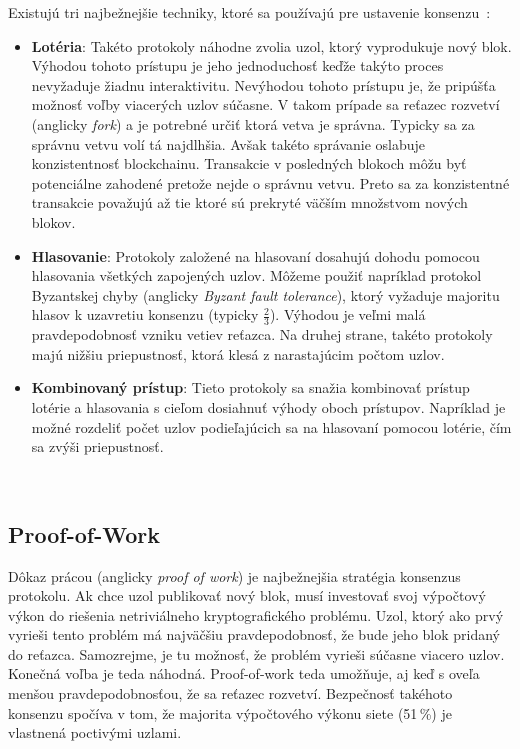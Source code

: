 Existujú tri najbežnejšie techniky, ktoré sa používajú pre ustavenie konsenzu~\cite{homoliakBlockchain}:
\begin{itemize}
	\item \textbf{Lotéria}: Takéto protokoly náhodne zvolia uzol, ktorý vyprodukuje nový blok. Výhodou tohoto prístupu je jeho jednoduchosť keďže takýto proces nevyžaduje žiadnu interaktivitu. Nevýhodou tohoto prístupu je, že pripúšťa možnosť voľby viacerých uzlov súčasne. V takom prípade sa reťazec rozvetví (anglicky \textit{fork}) a je potrebné určiť ktorá vetva je správna. Typicky sa za správnu vetvu volí tá najdlhšia. Avšak takéto správanie oslabuje konzistentnosť blockchainu. Transakcie v posledných blokoch môžu byť potenciálne zahodené pretože nejde o správnu vetvu. Preto sa za konzistentné transakcie považujú až tie ktoré sú prekryté väčším množstvom nových blokov.
	\item \textbf{Hlasovanie}: Protokoly založené na hlasovaní dosahujú dohodu pomocou hlasovania všetkých zapojených uzlov. Môžeme použiť napríklad protokol Byzantskej chyby (anglicky \textit{Byzant fault tolerance}), ktorý vyžaduje majoritu hlasov k uzavretiu konsenzu (typicky $\frac{2}{3}$). Výhodou je veľmi malá pravdepodobnosť vzniku vetiev reťazca. Na druhej strane, takéto protokoly majú nižšiu priepustnosť, ktorá klesá z narastajúcim počtom uzlov.
	\item \textbf{Kombinovaný prístup}: Tieto protokoly sa snažia kombinovať prístup lotérie a hlasovania s cieľom dosiahnuť výhody oboch prístupov. Napríklad je možné rozdeliť počet uzlov podieľajúcich sa na hlasovaní pomocou lotérie, čím sa zvýši priepustnosť.
\end{itemize}
~\cite{zhangConsensus, homoliakBlockchain}

\subsection{Proof-of-Work}\label{subsec:pow}
Dôkaz prácou (anglicky \textit{proof of work}) je najbežnejšia stratégia konsenzus protokolu. Ak chce uzol publikovať nový blok, musí investovať svoj výpočtový výkon do riešenia netriviálneho kryptografického problému. Uzol, ktorý ako prvý vyrieši tento problém má najväčšiu pravdepodobnosť, že bude jeho blok pridaný do reťazca. Samozrejme, je tu možnosť, že problém vyrieši súčasne viacero uzlov. Konečná voľba je teda náhodná. Proof-of-work teda umožňuje, aj keď s oveľa menšou pravdepodobnosťou, že sa reťazec rozvetví. Bezpečnosť takéhoto konsenzu spočíva v tom, že majorita výpočtového výkonu siete (51\,\%) je vlastnená poctivými uzlami.~\cite{leporeConsensus}

